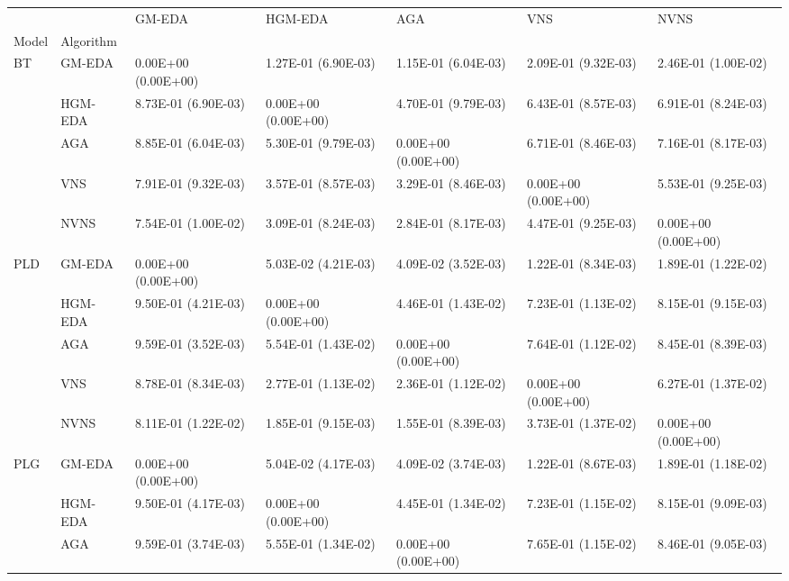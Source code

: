 \begin{tabular}{lllllll}
\toprule
   &      &               GM-EDA &              HGM-EDA &                  AGA &                  VNS &                 NVNS \\
Model & Algorithm &                      &                      &                      &                      &                      \\
\midrule
BT & GM-EDA &  0.00E+00 (0.00E+00) &  1.27E-01 (6.90E-03) &  1.15E-01 (6.04E-03) &  2.09E-01 (9.32E-03) &  2.46E-01 (1.00E-02) \\
   & HGM-EDA &  8.73E-01 (6.90E-03) &  0.00E+00 (0.00E+00) &  4.70E-01 (9.79E-03) &  6.43E-01 (8.57E-03) &  6.91E-01 (8.24E-03) \\
   & AGA &  8.85E-01 (6.04E-03) &  5.30E-01 (9.79E-03) &  0.00E+00 (0.00E+00) &  6.71E-01 (8.46E-03) &  7.16E-01 (8.17E-03) \\
   & VNS &  7.91E-01 (9.32E-03) &  3.57E-01 (8.57E-03) &  3.29E-01 (8.46E-03) &  0.00E+00 (0.00E+00) &  5.53E-01 (9.25E-03) \\
   & NVNS &  7.54E-01 (1.00E-02) &  3.09E-01 (8.24E-03) &  2.84E-01 (8.17E-03) &  4.47E-01 (9.25E-03) &  0.00E+00 (0.00E+00) \\
PLD & GM-EDA &  0.00E+00 (0.00E+00) &  5.03E-02 (4.21E-03) &  4.09E-02 (3.52E-03) &  1.22E-01 (8.34E-03) &  1.89E-01 (1.22E-02) \\
   & HGM-EDA &  9.50E-01 (4.21E-03) &  0.00E+00 (0.00E+00) &  4.46E-01 (1.43E-02) &  7.23E-01 (1.13E-02) &  8.15E-01 (9.15E-03) \\
   & AGA &  9.59E-01 (3.52E-03) &  5.54E-01 (1.43E-02) &  0.00E+00 (0.00E+00) &  7.64E-01 (1.12E-02) &  8.45E-01 (8.39E-03) \\
   & VNS &  8.78E-01 (8.34E-03) &  2.77E-01 (1.13E-02) &  2.36E-01 (1.12E-02) &  0.00E+00 (0.00E+00) &  6.27E-01 (1.37E-02) \\
   & NVNS &  8.11E-01 (1.22E-02) &  1.85E-01 (9.15E-03) &  1.55E-01 (8.39E-03) &  3.73E-01 (1.37E-02) &  0.00E+00 (0.00E+00) \\
PLG & GM-EDA &  0.00E+00 (0.00E+00) &  5.04E-02 (4.17E-03) &  4.09E-02 (3.74E-03) &  1.22E-01 (8.67E-03) &  1.89E-01 (1.18E-02) \\
   & HGM-EDA &  9.50E-01 (4.17E-03) &  0.00E+00 (0.00E+00) &  4.45E-01 (1.34E-02) &  7.23E-01 (1.15E-02) &  8.15E-01 (9.09E-03) \\
   & AGA &  9.59E-01 (3.74E-03) &  5.55E-01 (1.34E-02) &  0.00E+00 (0.00E+00) &  7.65E-01 (1.15E-02) &  8.46E-01 (9.05E-03) \\

\end{tabular}
